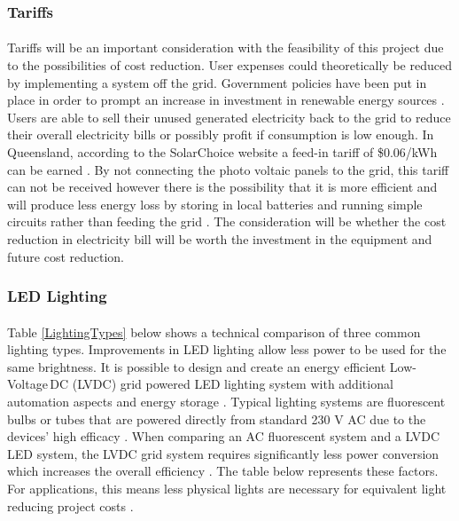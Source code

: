 \subsubsection{Tariffs}

\paragraph{}
Tariffs will be an important consideration with the feasibility of this project due to the
possibilities of cost reduction. User expenses could theoretically be reduced by implementing a system off the grid. Government policies have been put in place in order to prompt an increase in investment in renewable energy sources \cite{Nelson2011}. Users are able to sell their unused generated electricity back to the grid to reduce their overall electricity bills or possibly profit if consumption is low enough. In Queensland, according to the SolarChoice website a feed-in tariff of \$0.06/kWh can be earned \cite{website:SolarChoice}. By not connecting the photo voltaic panels to the grid, this tariff can not be received however there is the possibility that it is more efficient and will produce less energy loss by storing in local batteries and running simple circuits rather than feeding the grid \cite{AntoniouATzimasARowland2015}. The consideration will be whether the cost reduction in electricity bill will be worth the investment in the equipment and future cost reduction.   

\subsubsection{LED Lighting}

\paragraph{}
Table \ref{LightingTypes} below shows a technical comparison of three common lighting types. Improvements in LED lighting allow less power to be used for the same brightness. It is possible to design and create an energy efficient Low-Voltage\,DC (LVDC) grid powered LED lighting system with additional automation aspects and energy storage \cite{Koh2011}. Typical lighting systems are fluorescent bulbs or tubes that are powered directly from standard 230 V AC due to the devices' high efficacy \cite{Koh2011}. When comparing an AC fluorescent system and a LVDC LED system, the LVDC grid system requires significantly less power conversion which increases the overall efficiency \cite{Koh2011}. The table below represents these factors. For applications, this means less physical lights are necessary for equivalent light reducing project costs \cite{website:LED}.  

